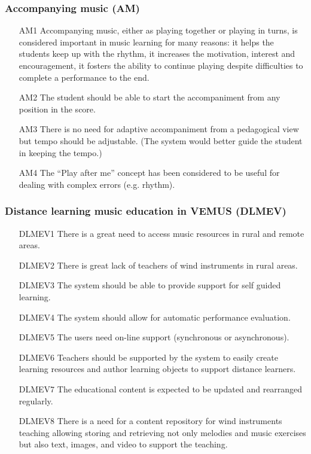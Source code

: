 \subsubsection{Accompanying music (AM)}
\begin{itemize} \itemsep0em
\item[AM1] Accompanying music, either as playing together or playing in turns, is considered important in music learning for many reasons: it helps the students keep up with the rhythm, it increases the motivation, interest and encouragement, it fosters the ability to continue playing despite difficulties to complete a performance to the end.
\item[AM2] The student should be able to start the accompaniment from any position in the score.
\item[AM3] There is no need for adaptive accompaniment from a pedagogical view but tempo should be adjustable. (The system would better guide the student in keeping the tempo.)
\item[AM4] The “Play after me” concept has been considered to be useful for dealing with complex errors (e.g. rhythm).
\end{itemize}


\subsubsection{Distance learning music education in VEMUS (DLMEV)}
\begin{itemize} \itemsep0em
\item[DLMEV1] There is a great need to access music resources in rural and remote areas.
\item[DLMEV2] There is great lack of teachers of wind instruments in rural areas.
\item[DLMEV3] The system should be able to provide support for self guided learning.
\item[DLMEV4] The system should allow for automatic performance evaluation.
\item[DLMEV5] The users need on-line support (synchronous or asynchronous).
\item[DLMEV6] Teachers should be supported by the system to easily create learning resources and author learning objects to support distance learners.
\item[DLMEV7] The educational content is expected to be updated and rearranged regularly.
\item[DLMEV8] There is a need for a content repository for wind instruments teaching allowing storing and retrieving not only melodies and music exercises but also text, images, and video to support the teaching.
\end{itemize}


